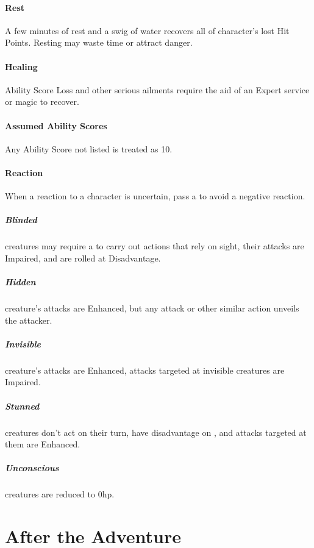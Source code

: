 \documentclass[itdr]{subfiles}
\begin{document}
\paragraph{Rest}
A few minutes of rest and a swig of water recovers all of character's lost Hit Points. Resting may waste time or attract danger.

\paragraph{Healing}
Ability Score Loss and other serious ailments require the aid of an Expert service or magic to recover.

\paragraph{Assumed Ability Scores}
Any Ability Score not listed is treated as 10.

\paragraph{Reaction}
When a reaction to a character is uncertain, pass a  to avoid a negative reaction.


\subparagraph{Blinded} creatures may require a  to carry out actions that rely on sight, their attacks are Impaired, and  are rolled at Disadvantage.

\subparagraph{Hidden} creature's attacks are Enhanced, but any attack or other similar action unveils the attacker.

\subparagraph{Invisible} creature's attacks are Enhanced, attacks targeted at invisible creatures are Impaired.

\subparagraph{Stunned} creatures don't act on their turn, have disadvantage on , and attacks targeted at them are Enhanced.

\subparagraph{Unconscious} creatures are reduced to 0hp.

\vfill
\break

\section{After the Adventure}
\end{document}
